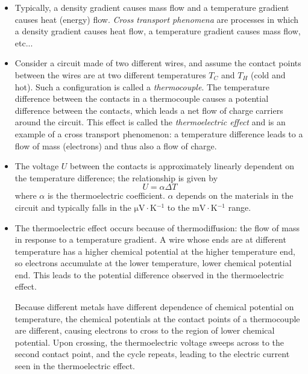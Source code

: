 \documentclass[11pt, a4paper]{article}
\begin{document}
\begin{itemize}
	\item Typically, a density gradient causes mass flow and a temperature gradient causes heat (energy) flow. \textit{Cross transport phenomena} are processes in which a density gradient causes heat flow, a temperature gradient causes mass flow, etc...
	
	\item Consider a circuit made of two different wires, and assume the contact points between the wires are at two different temperatures $ T_{C} $ and $ T_{H} $ (cold and hot). Such a configuration is called a \textit{thermocouple}. The temperature difference between the contacts in a thermocouple causes a potential difference between the contacts, which leads a net flow of charge carriers around the circuit. This effect is called the \textit{thermoelectric effect} and is an example of a cross transport phenomenon: a temperature difference leads to a flow of mass (electrons) and thus also a flow of charge.
	
	\item The voltage $ U $ between the contacts is approximately linearly dependent on the temperature difference; the relationship is given by
	\begin{equation*}
		U = \alpha \Delta T
	\end{equation*}
	where $ \alpha $ is the thermoelectric coefficient. $ \alpha $ depends on the materials in the circuit and typically falls in the $ \si{\micro \volt \cdot \kelvin^{-1}} $ to the $ \si{\milli \volt \cdot \kelvin^{-1}} $ range. 
	
	\item The thermoelectric effect occurs because of thermodiffusion: the flow of mass in response to a temperature gradient. A wire whose ends are at different temperature has a higher chemical potential at the higher temperature end, so electrons accumulate at the lower temperature, lower chemical potential end. This leads to the potential difference observed in the thermoelectric effect.
	
	Because different metals have different dependence of chemical potential on temperature, the chemical potentials at the contact points of a thermocouple are different, causing electrons to cross to the region of lower chemical potential. Upon crossing, the thermoelectric voltage sweeps across to the second contact point, and the cycle repeats, leading to the electric current seen in the thermoelectric effect.
	
\end{itemize}
\end{document}
